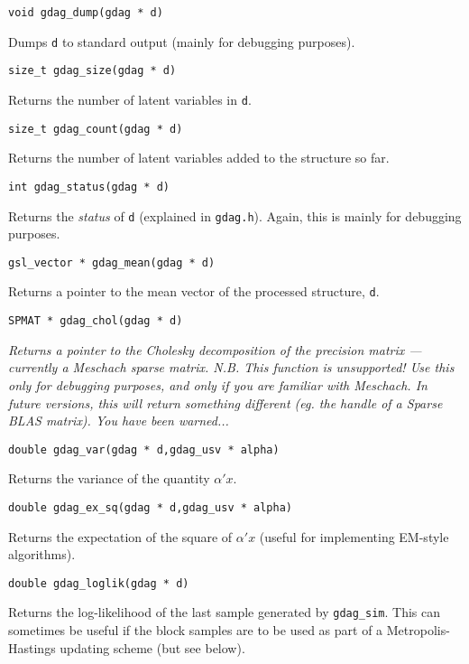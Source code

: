 \documentclass[12pt,a4paper]{article}
\begin{document}
\begin{verbatim}
void gdag_dump(gdag * d)
\end{verbatim}
Dumps \verb$d$ to standard output (mainly for debugging purposes).

\begin{verbatim}
size_t gdag_size(gdag * d)
\end{verbatim}
Returns the number of latent variables in \verb$d$.

\begin{verbatim}
size_t gdag_count(gdag * d)
\end{verbatim}
Returns the number of latent variables added to the structure so far.

\begin{verbatim}
int gdag_status(gdag * d)
\end{verbatim}
Returns the \emph{status} of \verb$d$ (explained in
\verb$gdag.h$). Again, this is mainly for debugging purposes.

\begin{verbatim}
gsl_vector * gdag_mean(gdag * d)
\end{verbatim}
Returns a pointer to the mean vector of the processed structure,
\verb$d$.

\begin{verbatim}
SPMAT * gdag_chol(gdag * d)
\end{verbatim}
\emph{Returns a pointer to the Cholesky decomposition of the precision
matrix --- currently a Meschach sparse matrix. N.B. This function is
unsupported! Use this only for debugging purposes, and only if you are
familiar with Meschach. In future versions, this will return something
different (\emph{eg.} the handle of a Sparse BLAS matrix). You have
been warned...}

\begin{verbatim}
double gdag_var(gdag * d,gdag_usv * alpha)
\end{verbatim}
Returns the variance of the quantity $\alpha'x$.

\begin{verbatim}
double gdag_ex_sq(gdag * d,gdag_usv * alpha)
\end{verbatim}
Returns the expectation of the square of $\alpha'x$ (useful for
implementing EM-style algorithms).

\begin{verbatim}
double gdag_loglik(gdag * d)
\end{verbatim}
Returns the log-likelihood of the last sample generated by
\verb$gdag_sim$. This can sometimes be useful if the block samples are
to be used as part of a Metropolis-Hastings updating scheme (but see below).
\end{document}
